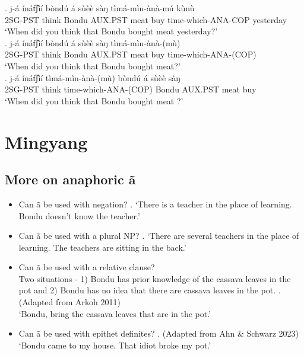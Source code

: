 \documentclass{assets/fieldnotes}
\begin{document}
\exg. j-á ínát͡ʃìí bòndú á sùèè sàŋ tìmá-mìn-ànà-mú kùnù\\
2SG-PST think Bondu AUX.PST meat buy time-which-ANA-COP yesterday\\
`When did you think that Bondu bought meat yesterday?'  \\  

\exg. j-á ínát͡ʃìí bòndú á sùèè sàŋ tìmá-mìn-ànà-(mù)\\
2SG-PST think Bondu AUX.PST meat buy time-which-ANA-(COP)\\
`When did you think that Bondu bought meat?'  \\  

\exg. j-á ínát͡ʃìí tìmá-mìn-ànà-(mù) bòndú á sùèè sàŋ\\
2SG-PST think time-which-ANA-(COP) Bondu AUX.PST meat buy\\
`When did you think that Bondu bought meat ?'  \\  
 



\section{Mingyang}
\subsection{More on anaphoric ã}
\begin{itemize}
    \item Can ã be used with negation?
    \ex. `There is a teacher in the place of learning. Bondu doesn't know the teacher.'
    \item Can ã be used with a plural NP?
    \ex. `There are several teachers in the place of learning. The teachers are sitting in the back.'
    \item Can ã be used with a relative clause?\\
    Two situations - 1) Bondu has prior knowledge of the cassava leaves in the pot and 2) Bondu has no idea that there are cassava leaves in the pot.
    \ex. (Adapted from Arkoh 2011)\\
    `Bondu, bring the cassava leaves that are in the pot.'
    \item Can ã be used with epithet definites?
    \ex. (Adapted from Ahn \& Schwarz 2023)\\
    `Bondu came to my house. That idiot broke my pot.'
\end{itemize}
\end{document}
